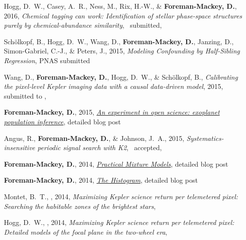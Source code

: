 \item Hogg, D.~W., Casey, A.~R., Ness, M., Rix, H.-W., \&
    {\bf Foreman-Mackey, D.},
    2016,
    \emph{Chemical tagging can work: Identification of stellar phase-space
          structures purely by chemical-abundance similarity},
    \apj\ submitted, 

\item Sch{\"o}lkopf, B., Hogg, D.~W., Wang, D., {\bf Foreman-Mackey, D.},
    Janzing, D., Simon-Gabriel, C.-J., \& Peters, J., 2015,
    \emph{Modeling Confounding by Half-Sibling Regression},
    PNAS submitted

\item Wang, D., {\bf Foreman-Mackey, D.}, Hogg, D.~W., \& Sch{\"o}lkopf, B.,
    \emph{Calibrating the pixel-level Kepler imaging data with a causal
          data-driven model},
    2015, submitted to \pasp, 

\item {\bf Foreman-Mackey, D.}, 2015,
    \href{http://dan.iel.fm/posts/exopop/}
         {\emph{An experiment in open science: exoplanet population
                inference}},
    detailed blog post

\item Angus, R., {\bf Foreman-Mackey, D.}, \& Johnson, J.~A., 2015,
    \emph{Systematics-insensitive periodic signal search with K2},
    \apj\ accepted, 

\item {\bf Foreman-Mackey, D.}, 2014,
    \href{http://dan.iel.fm/posts/mixture-models/}
         {\emph{Practical Mixture Models}},
    detailed blog post

\item {\bf Foreman-Mackey, D.}, 2014,
    \href{http://dan.iel.fm/posts/histogram1/}
         {\emph{The Histogram}},
    detailed blog post

\item Montet, B.~T., \etal, 2014,
    \emph{Maximizing Kepler science return per telemetered pixel: Searching
          the habitable zones of the brightest stars},

\item Hogg, D.~W., \etal, 2014,
    \emph{Maximizing Kepler science return per telemetered pixel: Detailed
          models of the focal plane in the two-wheel era},
